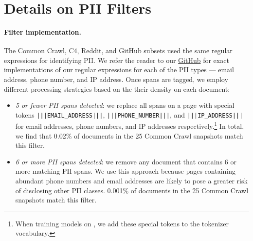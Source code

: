 \section{Details on PII Filters}
\label{app:pii-filter-details}

\paragraph{Filter implementation.} The Common Crawl, C4, Reddit, and GitHub subsets used the same regular expressions for identifying PII.
We refer the reader to our \href{https://anonymous.4open.science/r/dolma-55C2/}{GitHub} for exact implementations of our regular expressions for each of the PII types --- email address, phone number, and IP address.
Once spans are tagged, we employ different processing strategies based on the their density on each document:
\begin{itemize}[leftmargin=1em,itemsep=1mm,topsep=1mm]
    \item \textit{5 or fewer PII spans detected}: 
    we replace all spans on a page with special tokens \texttt{|\negthickspace|\negthickspace|EMAIL\_ADDRESS|\negthickspace|\negthickspace|}, \texttt{|\negthickspace|\negthickspace|PHONE\_NUMBER|\negthickspace|\negthickspace|}, and \texttt{|\negthickspace|\negthickspace|IP\_ADDRESS|\negthickspace|\negthickspace|} for email addresses, phone numbers, and IP addresses respectively.\footnote{When training models on \dolma, we add these special tokens to the tokenizer vocabulary.}
    In total, we find that 0.02\% of documents in the 25 Common Crawl snapshots match this filter. 
    \item \textit{6 or more PII spans detected}: 
    we remove any document that contains 6 or more matching PII spans. 
    We use this approach because pages containing abundant phone numbers and email addresses are likely to pose a greater risk of disclosing other PII classes. 
    0.001\% of documents in the 25 Common Crawl snapshots match this filter.
\end{itemize}




